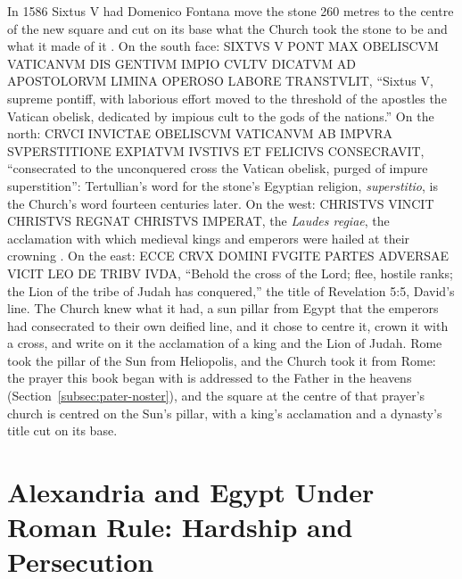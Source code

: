 In 1586 Sixtus V had Domenico Fontana move the stone 260 metres to the centre of the new square and cut on its base what the Church took the stone to be and what it made of it \cite{iversen:obelisks-in-exile}.
On the south face: SIXTVS V PONT MAX OBELISCVM VATICANVM DIS GENTIVM IMPIO CVLTV DICATVM AD APOSTOLORVM LIMINA OPEROSO LABORE TRANSTVLIT, ``Sixtus V, supreme pontiff, with laborious effort moved to the threshold of the apostles the Vatican obelisk, dedicated by impious cult to the gods of the nations.''
On the north: CRVCI INVICTAE OBELISCVM VATICANVM AB IMPVRA SVPERSTITIONE EXPIATVM IVSTIVS ET FELICIVS CONSECRAVIT, ``consecrated to the unconquered cross the Vatican obelisk, purged of impure superstition'': Tertullian's word for the stone's Egyptian religion, \emph{superstitio}, is the Church's word fourteen centuries later.
On the west: CHRISTVS VINCIT CHRISTVS REGNAT CHRISTVS IMPERAT, the \emph{Laudes regiae}, the acclamation with which medieval kings and emperors were hailed at their crowning \cite{kantorowicz:laudes-regiae}.
On the east: ECCE CRVX DOMINI FVGITE PARTES ADVERSAE VICIT LEO DE TRIBV IVDA, ``Behold the cross of the Lord; flee, hostile ranks; the Lion of the tribe of Judah has conquered,'' the title of Revelation 5:5, David's line.
The Church knew what it had, a sun pillar from Egypt that the emperors had consecrated to their own deified line, and it chose to centre it, crown it with a cross, and write on it the acclamation of a king and the Lion of Judah.
Rome took the pillar of the Sun from Heliopolis, and the Church took it from Rome: the prayer this book began with is addressed to the Father in the heavens (Section~\ref{subsec:pater-noster}), and the square at the centre of that prayer's church is centred on the Sun's pillar, with a king's acclamation and a dynasty's title cut on its base.
\section{Alexandria and Egypt Under Roman Rule: Hardship and Persecution}\label{sec:alexandria-egypt-suffered-enormous-hardship-and-persecution-during-the-roman-empire.}

